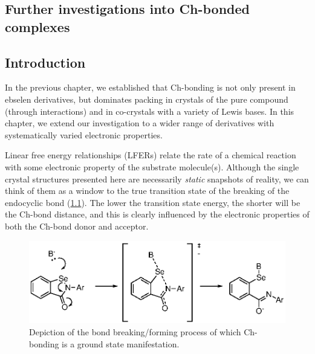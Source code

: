 \begin{refsection}

\chapter{Further investigations into Ch-bonded complexes}

\section{Introduction}
In the previous chapter, we established that Ch-bonding is not only present in ebselen derivatives, but dominates packing in crystals of the pure compound (through  interactions) and in co-crystals with a variety of Lewis bases.
In this chapter, we extend our investigation to a wider range of derivatives with systematically varied electronic properties.

Linear free energy relationships (LFERs) relate the rate of a chemical reaction with some electronic property of the substrate molecule(s).
Although the single crystal structures presented here are necessarily \emph{static} snapshots of reality, we can think of them as a window to the true transition state of the breaking of the endocyclic  bond (\cref{fig:bond-breaking}).
The lower the transition state energy, the shorter will be the  Ch-bond distance, and this is clearly influenced by the electronic properties of both the Ch-bond donor and acceptor.

\begin{figure}
  \includegraphics[scale=0.74]{Figures/bond-breaking.eps}
  \caption[Nucleophilic substitution at selenium.]{Depiction of the bond breaking/forming process of which Ch-bonding is a ground state manifestation.}
  \label{fig:bond-breaking}
\end{figure}


\end{refsection}
